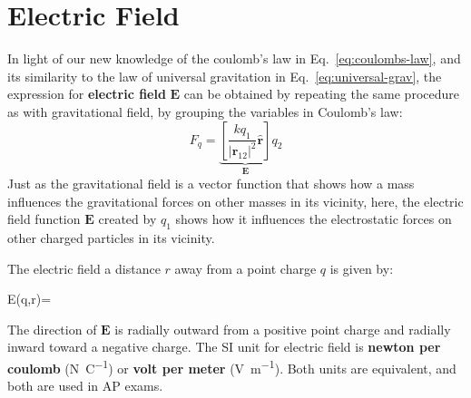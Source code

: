     
\section{Electric Field}
In light of our new knowledge of the coulomb's law in
Eq.~\ref{eq:coulombs-law}, and its similarity to the law of universal
gravitation in Eq.~\ref{eq:universal-grav}, the expression for
\textbf{electric field} $\bm E$ can be obtained by repeating the same procedure
as with gravitational field, by grouping the variables in Coulomb's law:
\begin{equation}
  F_q
  =\underbrace{
    \left[\frac{kq_1}{|\bm r_{12}|^2}\hat{\bm r}\right]
  }_{\bm E}q_2
\end{equation}
Just as the gravitational field is a vector function that shows how a mass
influences the gravitational forces on other masses in its vicinity, here, the
electric field function $\bm E$ created by $q_1$ shows how it influences the
electrostatic forces on other charged particles in its vicinity.

The electric field a distance $r$ away from a point charge $q$ is given by:
\begin{important-equation}
  \bm E(q,\bm r)=
   \quad{}
  \label{eq:pt-charge-E}
\end{important-equation}
The direction of $\bm E$ is radially outward from a positive point charge
and radially inward toward a negative charge. The SI unit for electric field
is \textbf{newton per coulomb} (\si{\newton\per\coulomb}) or
\textbf{volt per meter} (\si{\volt\per\metre}). Both units are equivalent,
and both are used in AP exams.

